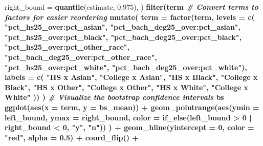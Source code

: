\documentclass[
  11pt,
]{article}
\newenvironment{Shaded}{\begin{snugshade}}{\end{snugshade}}
\newcommand{\CommentTok}[1]{\textcolor[rgb]{0.56,0.35,0.01}{\textit{#1}}}
\newcommand{\DataTypeTok}[1]{\textcolor[rgb]{0.13,0.29,0.53}{#1}}
\newcommand{\DecValTok}[1]{\textcolor[rgb]{0.00,0.00,0.81}{#1}}
\newcommand{\FloatTok}[1]{\textcolor[rgb]{0.00,0.00,0.81}{#1}}
\newcommand{\KeywordTok}[1]{\textcolor[rgb]{0.13,0.29,0.53}{\textbf{#1}}}
\newcommand{\NormalTok}[1]{#1}
\newcommand{\OperatorTok}[1]{\textcolor[rgb]{0.81,0.36,0.00}{\textbf{#1}}}
\newcommand{\StringTok}[1]{\textcolor[rgb]{0.31,0.60,0.02}{#1}}
\begin{document}
\begin{Shaded}
\begin{Highlighting}[]
{{{{{{{{{{{{{{{{{{{{{{{{{{{{{{{{{{{    \DataTypeTok{right_bound =} \KeywordTok{quantile}\NormalTok{(estimate, }\FloatTok{0.975}\NormalTok{),}
\NormalTok{  ) }\OperatorTok{%
\StringTok{  }\KeywordTok{filter}\NormalTok{(term }\OperatorTok{%
\StringTok{  }\CommentTok{# Convert terms to factors for easier reordering}
\StringTok{  }\KeywordTok{mutate}\NormalTok{(}
    \DataTypeTok{term =} \KeywordTok{factor}\NormalTok{(term, }
                  \DataTypeTok{levels =} \KeywordTok{c}\NormalTok{(}
                    \StringTok{"pct_hs25_over:pct_asian"}\NormalTok{, }\StringTok{"pct_bach_deg25_over:pct_asian"}\NormalTok{,}
                    \StringTok{"pct_hs25_over:pct_black"}\NormalTok{, }\StringTok{"pct_bach_deg25_over:pct_black"}\NormalTok{,}
                    \StringTok{"pct_hs25_over:pct_other_race"}\NormalTok{, }\StringTok{"pct_bach_deg25_over:pct_other_race"}\NormalTok{,}
                    \StringTok{"pct_hs25_over:pct_white"}\NormalTok{, }\StringTok{"pct_bach_deg25_over:pct_white"}\NormalTok{),}
                  \DataTypeTok{labels =} \KeywordTok{c}\NormalTok{(}
                    \StringTok{"HS x Asian"}\NormalTok{, }\StringTok{"College x Asian"}\NormalTok{,}
                    \StringTok{"HS x Black"}\NormalTok{, }\StringTok{"College x Black"}\NormalTok{,}
                    \StringTok{"HS x Other"}\NormalTok{, }\StringTok{"College x Other"}\NormalTok{,}
                    \StringTok{"HS x White"}\NormalTok{, }\StringTok{"College x White"}
\NormalTok{                  ))}
\NormalTok{  )}
\CommentTok{# Visualize the bootstrap confidence intervals}
\NormalTok{bs }\OperatorTok{%
\StringTok{  }\KeywordTok{ggplot}\NormalTok{(}\KeywordTok{aes}\NormalTok{(}\DataTypeTok{x =}\NormalTok{ term, }\DataTypeTok{y =}\NormalTok{ bs_mean)) }\OperatorTok{+}
\StringTok{  }\KeywordTok{geom_pointrange}\NormalTok{(}\KeywordTok{aes}\NormalTok{(}\DataTypeTok{ymin =}\NormalTok{ left_bound, }\DataTypeTok{ymax =}\NormalTok{ right_bound,}
                      \DataTypeTok{color =} \KeywordTok{if_else}\NormalTok{(left_bound }\OperatorTok{>}\StringTok{ }\DecValTok{0} \OperatorTok{|}\StringTok{ }\NormalTok{right_bound }\OperatorTok{<}\StringTok{ }\DecValTok{0}\NormalTok{, }\StringTok{"y"}\NormalTok{, }\StringTok{"n"}\NormalTok{))}
\NormalTok{                  ) }\OperatorTok{+}
\StringTok{  }\KeywordTok{geom_hline}\NormalTok{(}\DataTypeTok{yintercept =} \DecValTok{0}\NormalTok{, }\DataTypeTok{color =} \StringTok{"red"}\NormalTok{, }\DataTypeTok{alpha =} \FloatTok{0.5}\NormalTok{) }\OperatorTok{+}
\StringTok{  }\KeywordTok{coord_flip}\NormalTok{() }\OperatorTok{+}
}}}}}}}}}}}}}}}}}}}}}}}}}}}}}}}}}}}}}}
\end{Highlighting}
\end{Shaded}
\end{document}
